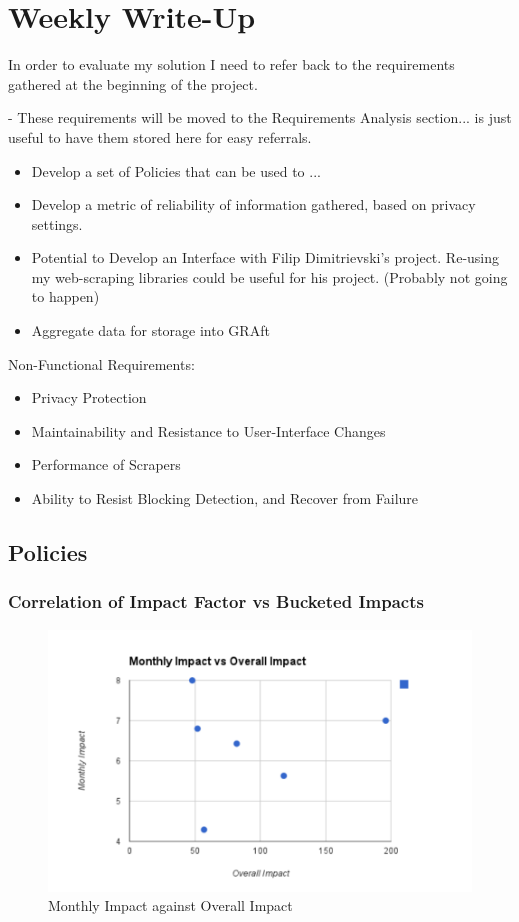 \chapter{Weekly Write-Up}\label{C:us}




In order to evaluate my solution I need to refer back to the requirements gathered at the beginning of the project. 

- These requirements will be moved to the Requirements Analysis section... is just useful to have them stored here for easy referrals. 

\begin{itemize}
\item Develop a set of Policies that can be used to ...
\item Develop a metric of reliability of information gathered, based on privacy settings.
\item Potential to Develop an Interface with Filip Dimitrievski's project. Re-using my web-scraping libraries could be useful for his project. (Probably not going to happen)
\item Aggregate data for storage into GRAft
\end{itemize}

Non-Functional Requirements:
\begin{itemize}
\item Privacy Protection
\item Maintainability and Resistance to User-Interface Changes
\item Performance of Scrapers
\item Ability to Resist Blocking Detection, and Recover from Failure
\end{itemize}

\section{Policies}

\subsection{Correlation of Impact Factor vs Bucketed Impacts}

\begin{figure}[h!]
\centering
\includegraphics{Images/monthly_impact_vs_overall_impact.pdf}
\caption{Monthly Impact against Overall Impact}
\end{figure}

